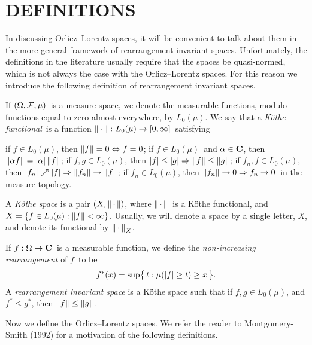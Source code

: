 \section{DEFINITIONS}

In discussing Orlicz--Lorentz spaces, it will be convenient to talk about 
them
in the more general framework of rearrangement invariant spaces. 
Unfortunately,
the definitions in the literature usually require that the spaces be
quasi-normed, which is not always the case with the Orlicz--Lorentz spaces. 
For
this reason we introduce the following definition of rearrangement invariant
spaces.

\begin{defin} If $(\Omega,{\cal F},\mu)$\ is a measure space, we denote the 
measurable
functions, modulo functions equal to zero almost everywhere, by $L_0(\mu)$. 
We
say that a
{\em K\"othe functional}\ is a
function
$\left\| \,\cdot\, \right\|\colon L_0(\mu)\to[0,\infty]$\ satisfying
\begin{itemrom}
\itemi if $f\in L_0(\mu)$, then $\left\| f \right\|=0\Leftrightarrow f=0$;
\itemii if $f\in L_0(\mu)$\ and $\alpha\in{\bf C}$, then $\left\| \alpha
f \right\|=\left| \alpha \right|
\left\| f \right\|$;
\itemiii if $f,g\in L_0(\mu)$, then $\left| f \right|\le\left| g \right| \Rightarrow
\left\| f \right\|\le
\left\| g \right\|$;
\itemiv if $f_n,f\in L_0(\mu)$, then $\left| f_n \right|\nearrow\left| f \right| \Rightarrow \left\| f_n \right\|\to\left\| f \right\|$;
\itemv if $f_n\in L_0(\mu)$, then $\left\| f_n \right\|\to0
\Rightarrow f_n\to0$\ in the measure topology.
\end{itemrom}
\noindent
A {\em K\"othe space\/} 
is a pair $(X,\left\| \,\cdot\, \right\|)$, where $\left\| \,\cdot\, \right\|$\ is a
K\"othe functional, and $X=\{f\in L_0(\mu):\left\| f \right\| <\infty\}$.
Usually, we will denote a space by a single letter, $X$, and denote its
functional by $\left\| \,\cdot\, \right\|_X$.
\end{defin}

\begin{defin} If $f:\Omega\to{\bf C}$\ is a measurable function, we define the 
{\em
non-increasing rearrangement\/} 
of $f$\ to be  
$$ f^*(x) = \sup\bigl\{\, t : \mu(\left| f \right| \ge t) \ge x \,\bigr\} .$$ 
A {\em rearrangement invariant space\/}
is a K\"othe
space such that if $f,g\in
L_0(\mu)$, and $f^* \le g^*$,
then $\left\| f \right\| \le \left\| g \right\|$.
\end{defin}

Now we define the Orlicz--Lorentz spaces. We refer the reader to 
Montgomery-Smith (1992) for a
motivation of the following definitions.

